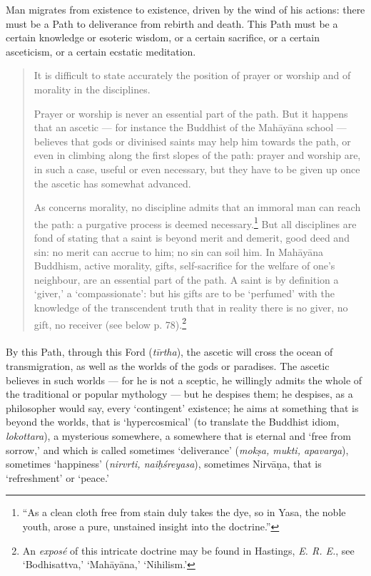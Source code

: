 \documentclass[a4paper, 11pt, oneside, english, landscape]{article}
\begin{document}
Man migrates from existence to existence, driven by the wind of his actions: there must be a Path to deliverance from rebirth and death. This Path must be a certain knowledge or esoteric wisdom, or a certain sacrifice, or a certain asceticism, or a certain ecstatic meditation.
\begin{quotation}
\small
It is difficult to state accurately the position of prayer or worship and of morality in the disciplines.

Prayer or worship is never an essential part of the path. But it happens that an ascetic --- for instance the Buddhist of the Mahāyāna school --- believes that gods or divinised saints may help him towards the path, or even in climbing along the first slopes of the path: prayer and worship are, in such a case, useful or even necessary, but they have to be given up once the ascetic has somewhat advanced.

As concerns morality, no discipline admits that an immoral man can reach the path: a purgative process is deemed necessary.\footnote{``As a clean cloth free from stain duly takes the dye, so in Yasa, the noble youth, arose a pure, unstained insight into the doctrine.''} But all disciplines are fond of stating that a saint is beyond merit and demerit, good deed and sin: no merit can accrue to him; no sin can soil him. In Mahāyāna Buddhism, active morality, gifts, self-sacrifice for the welfare of one's neighbour, are an essential part of the path. A saint is by definition a `giver,' a `compassionate': but his gifts are to be `perfumed' with the knowledge of the transcendent truth that in reality there is no giver, no gift, no receiver (see below p. 78).\footnote{An \emph{exposé} of this intricate doctrine may be found in Hastings, \emph{E. R. E.}, see `Bodhisattva,' `Mahāyāna,' `Nihilism.'}
\end{quotation}
\paragraph{}
By this Path, through this Ford (\emph{tīrtha}), the ascetic will cross the ocean of transmigration, as well as the worlds of the gods or paradises. The ascetic believes in such worlds --- for he is not a sceptic, he willingly admits the whole of the traditional or popular mythology --- but he despises them; he despises, as a philosopher would say, every `contingent' existence; he aims at something that is beyond the worlds, that is `hypercosmical' (to translate the Buddhist idiom, \emph{lokottara}), a mysterious somewhere, a somewhere that is eternal and `free from sorrow,' and which is called sometimes `deliverance' (\emph{mokṣa, mukti, apavarga}), sometimes `happiness' (\emph{nirvrti, naiḥśreyasa}), sometimes Nirvāṇa, that is `refreshment' or `peace.'
\end{document}
